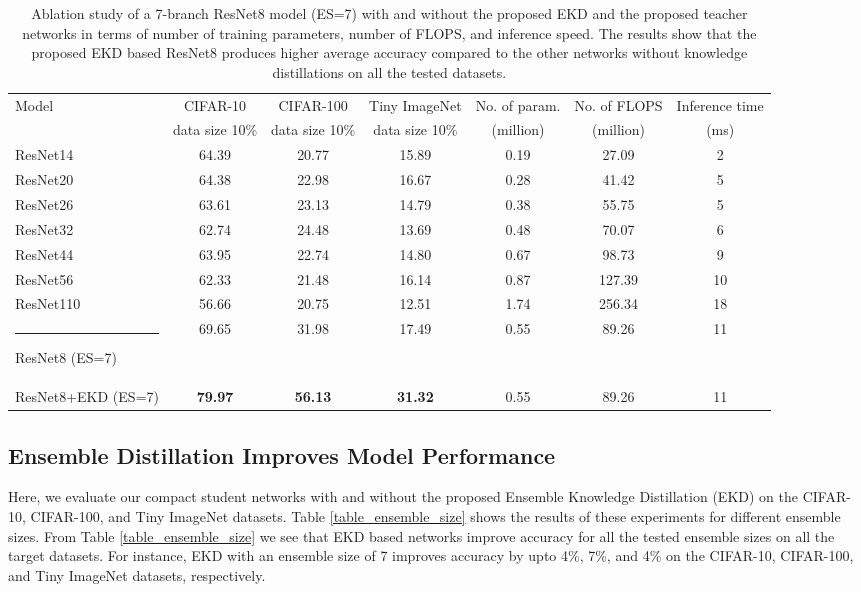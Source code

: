 \documentclass{ecai}
\begin{document}
\begin{table*}[t]
	\caption{Ablation study of a 7-branch ResNet8 model (ES=7) with and without the proposed EKD and the proposed teacher networks in terms of number of training parameters, number of FLOPS, and inference speed. The results show that the proposed EKD based ResNet8 produces higher average accuracy compared to the other networks without knowledge distillations on all the tested datasets.}
	\vspace{-0pt}
	\centering
	\setlength\tabcolsep{5pt}\centering
	\begin{tabular}{@{}lcccccc@{}}
		\toprule
		\multirow{2}{*}{Model}&CIFAR-10&CIFAR-100&Tiny ImageNet&No. of param.&No. of FLOPS&Inference time\\
		&data size 10\%&data size 10\%&data size 10\%&(million)&(million)&(ms)\\					
		\midrule
ResNet14	&64.39&20.77&15.89	&0.19&27.09&2\\
		ResNet20	&64.38&22.98&16.67	&0.28&41.42&5\\
		ResNet26	&63.61&23.13&14.79	&0.38&55.75&5\\
		ResNet32	&62.74&24.48&13.69	&0.48&70.07&6\\
		ResNet44	&63.95&22.74&14.80	&0.67&98.73&9\\
		ResNet56	&62.33&21.48&16.14	&0.87&127.39&10\\
		ResNet110	&56.66&20.75&12.51&1.74&256.34&18\\
		\hline
		\rule{-2.5pt}{3ex}
		ResNet8 (ES=7)&69.65&31.98&17.49&0.55&89.26&11\\
		ResNet8+EKD (ES=7)&\textbf{79.97}&\textbf{56.13}&\textbf{31.32}&0.55&89.26&11\\
		\bottomrule
	\end{tabular}
	\vspace{-0pt}
	\label{table_teachers}
\end{table*}
\subsection{Ensemble Distillation Improves Model Performance}
Here, we evaluate our compact student networks with and without the proposed Ensemble Knowledge Distillation (EKD) on the CIFAR-10, CIFAR-100, and Tiny ImageNet datasets. Table \ref{table_ensemble_size} shows the results of these experiments for different ensemble sizes. From Table \ref{table_ensemble_size} we see that EKD based networks improve accuracy for all the tested ensemble sizes on all the target datasets. For instance, EKD with an ensemble size of 7 improves accuracy by upto 4\%, 7\%, and 4\% on the CIFAR-10, CIFAR-100, and Tiny ImageNet datasets, respectively. 
\end{document}
